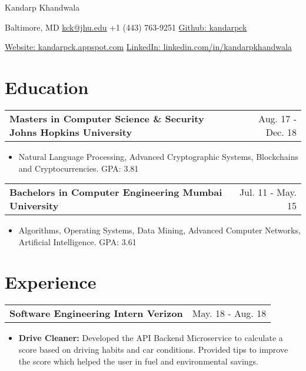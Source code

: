 \documentclass[a4paper,10pt]{article}
\makeatletter
\newcommand{\projectHeading}[2]{
    \begin{tabular*}{1\textwidth}{l@{\extracolsep{\fill}}r}
      \large{\textbf{#1}} & \small{#2} 
    \end{tabular*}
}
\newcommand{\resumeItemListStart}{\begin{itemize}[topsep=3pt, parsep=1pt, listparindent=0pt, itemindent=0pt, itemsep=0.5pt, leftmargin=*]}
\newcommand{\resumeItemListEnd}{\end{itemize}}
\makeatother
\begin{document}
\centerline{\LARGE{Kandarp Khandwala}}
\centerline{\normalsize{Baltimore, MD \textbar{} \href{mailto:kck@jhu.edu}{kck@jhu.edu} \textbar{} +1 (443) 763-9251 \textbar{} \href{https://github.com/kandarpck}{Github: kandarpck} }}
\centerline{\normalsize{\href{https://kandarpck.appspot.com/}{Website: kandarpck.appspot.com}  \textbar{} \href{https://www.linkedin.com/in/kandarpkhandwala}{LinkedIn: linkedin.com/in/kandarpkhandwala}}}


\section{Education}
  	\projectHeading{Masters in Computer Science \& Security \textbar{} Johns Hopkins University}{Aug. 17 - Dec. 18}
	\begin{itemize}[nosep, leftmargin=*]
		\item{\small Natural Language Processing, Advanced Cryptographic Systems, Blockchains and Cryptocurrencies. \hfill{} GPA: 3.81}
   	\end{itemize}
   \vspace{3pt}
    \projectHeading
      {Bachelors in Computer Engineering \textbar{} Mumbai University}{Jul. 11 - May. 15}
      \begin{itemize}[nosep, leftmargin=*]
      \item{\small Algorithms, Operating Systems, Data Mining, Advanced Computer Networks, Artificial Intelligence. \hfill{} GPA: 3.61}
    \end{itemize}

\section{Experience}
  
    \projectHeading{Software Engineering Intern \textbar{} Verizon}
 	 {May. 18 - Aug. 18}
  	\resumeItemListStart
  		\item\small{
  			\textbf{Drive Cleaner: }
  			{Developed the API Backend Microservice to calculate a score based on driving habits and car conditions. Provided tips to improve the score which helped the user in fuel and environmental savings.}}
  	\resumeItemListEnd
  
\end{document}
